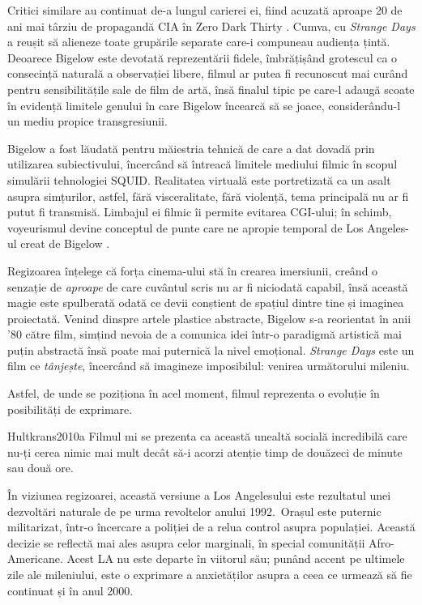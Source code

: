 \documentclass[12pt]{article}
\begin{document}
Critici similare au continuat de-a lungul carierei ei, fiind acuzată aproape 20 de ani mai târziu de propagandă CIA în Zero Dark Thirty \cite{Vishnevetsky2012a}. Cumva, cu \textit{Strange Days} a reușit să alieneze toate grupările separate care-i compuneau audiența țintă. Deoarece Bigelow este devotată reprezentării fidele, îmbrățișând grotescul ca o consecință naturală a observației libere, filmul ar putea fi recunoscut mai curând pentru sensibilitățile sale de film de artă, însă finalul tipic pe care-l adaugă scoate în evidență limitele genului în care Bigelow încearcă să se joace, considerându-l un mediu propice transgresiunii.\par

Bigelow a fost lăudată pentru măiestria tehnică de care a dat dovadă prin utilizarea subiectivului, încercând să întreacă limitele mediului filmic în scopul simulării tehnologiei \dedouble SQUID\sqtworight. Realitatea virtuală este portretizată ca un asalt asupra simțurilor, astfel, fără visceralitate, fără violență, tema principală nu ar fi putut fi transmisă. Limbajul ei filmic îi permite evitarea CGI-ului; în schimb, voyeurismul devine conceptul de punte care ne apropie temporal de Los Angeles-ul creat de Bigelow \cite{Hultkrans2010a}.\par

Regizoarea înțelege că forța cinema-ului stă în crearea imersiunii, creând o senzație de \textit{aproape} de care cuvântul scris nu ar fi niciodată capabil, însă această magie este spulberată odată ce devii conștient de spațiul dintre tine și imaginea proiectată. Venind dinspre artele plastice abstracte, Bigelow s-a reorientat în anii '80 către film, simțind nevoia de a comunica idei într-o paradigmă artistică mai puțin abstractă însă poate mai puternică la nivel emoțional. \textit{Strange Days} este un film ce \textit{tânjește}, încercând să imagineze imposibilul: venirea următorului mileniu.

Astfel, de unde se poziționa în acel moment, filmul reprezenta o evoluție în posibilități de exprimare.\par

\begin{displaycquote}{Hultkrans2010a}
	Filmul mi se prezenta ca această unealtă socială incredibilă care nu-ți cerea nimic mai mult decât să-i acorzi atenție timp de douăzeci de minute sau două ore.
\end{displaycquote}

În viziunea regizoarei, această versiune a Los Angelesului este rezultatul unei dezvoltări naturale de pe urma revoltelor anului 1992. Orașul este puternic militarizat, într-o încercare a poliției de a relua control asupra populației. Această decizie se reflectă mai ales asupra celor marginali, în special comunității Afro-Americane. Acest LA nu este departe în viitorul său; punând accent pe ultimele zile ale mileniului, este o exprimare a anxietăților asupra a ceea ce urmează să fie continuat și în anul 2000.\par
\end{document}
